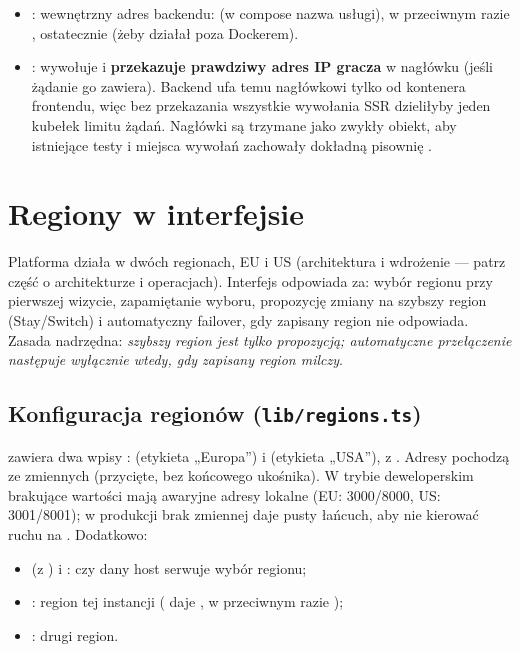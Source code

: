 \begin{itemize}[nosep]
  \item {}: wewnętrzny adres backendu:  (w compose nazwa
        usługi), w przeciwnym razie , ostatecznie 
        (żeby  działał poza Dockerem).
  \item {}: wywołuje  i
        \textbf{przekazuje prawdziwy adres IP gracza} w nagłówku  (jeśli
        żądanie go zawiera). Backend ufa temu nagłówkowi tylko od kontenera frontendu, więc bez
        przekazania wszystkie wywołania SSR dzieliłyby jeden kubełek limitu żądań. Nagłówki są
        trzymane jako zwykły obiekt, aby istniejące testy i miejsca wywołań zachowały dokładną
        pisownię .
\end{itemize}

\section{Regiony w interfejsie}\label{sec:fe-regiony}

Platforma działa w dwóch regionach, EU i US (architektura i wdrożenie --- patrz część o
architekturze i operacjach). Interfejs odpowiada za: wybór regionu przy pierwszej wizycie,
zapamiętanie wyboru, propozycję zmiany na szybszy region (Stay/Switch) i automatyczny failover,
gdy zapisany region nie odpowiada. Zasada nadrzędna: \emph{szybszy region jest tylko
propozycją; automatyczne przełączenie następuje wyłącznie wtedy, gdy zapisany region milczy}.

\subsection{Konfiguracja regionów (\texttt{lib/regions.ts})}

 zawiera dwa wpisy  :
 (etykieta „Europa”) i  (etykieta „USA”), z .
Adresy pochodzą ze zmiennych  (przycięte, bez końcowego
ukośnika). W trybie deweloperskim brakujące wartości mają awaryjne adresy lokalne
(EU: 3000/8000, US: 3001/8001); w produkcji brak zmiennej daje pusty łańcuch, aby nie kierować
ruchu na . Dodatkowo:

\begin{itemize}[nosep]
  \item {} (z ) i : czy dany host
        serwuje wybór regionu;
  \item {}: region tej instancji ( daje ,
        w przeciwnym razie );
  \item {}: drugi region.
\end{itemize}


